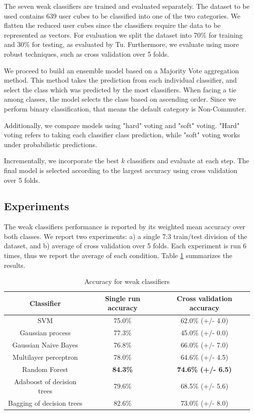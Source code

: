\documentclass{article}
\begin{document}
The seven weak classifiers are trained and evaluated separately. The dataset to be used contains 639 user cubes to be classified into one of the two categories. We flatten the reduced user cubes since the classifiers require the data to be represented as vectors. For evaluation we split the dataset into 70\% for training and 30\% for testing, as evaluated by Tu. Furthermore, we evaluate using more robust techniques, such as cross validation over 5 folds. 

We proceed to build an ensemble model based on a Majority Vote aggregation method. This method takes the prediction from each individual classifier, and select the class which was predicted by the most classifiers. When facing a tie among classes, the model selects the class based on ascending order. Since we perform binary classification, that means the default category is Non-Commuter. 

Additionally, we compare models using "hard" voting and "soft" voting. "Hard" voting refers to taking each classifier class prediction, while "soft" voting works under probabilistic predictions. 

Incrementally, we incorporate the best $k$ classifiers and evaluate at each step. The final model is selected according to the largest accuracy using cross validation over 5 folds. 

\subsection{Experiments} 
The weak classifiers performance is reported by its weighted mean accuracy over both classes. We report two experiments: a) a single 7:3 train/test division of the dataset, and b) average of cross validation over 5 folds. Each experiment is run 6 times, thus we report the average of each condition. Table \ref{table:weakClassifiers} summarizes the results. 



\begin{table}[H]
\centering
\begin{tabular}{||c|c|c||}
\hline
\textbf{Classifier} & \textbf{Single run accuracy} & \textbf{Cross validation accuracy} \\ [0.5ex] 
\hline \hline
SVM & 75.0\% & 62.0\% (+/- 4.0)\\
Gaussian process & 77.3\% & 45.0\% (+/- 0.0)\\
Gaussian Naive Bayes & 76.8\% & 66.0\% (+/- 7.0)\\
Multilayer perceptron & 78.0\% & 64.6\% (+/- 4.5)\\
Random Forest & \textbf{84.3\%} & \textbf{74.6\% (+/- 6.5)}\\
Adaboost of decision trees & 79.6\% & 68.5\% (+/- 5.6)\\
Bagging of decision trees & 82.6\% & 73.0\% (+/- 8.0)\\
\hline 
\end{tabular}
\caption{Accuracy for weak classifiers}
\label{table:weakClassifiers}
\end{table}
\end{document}
